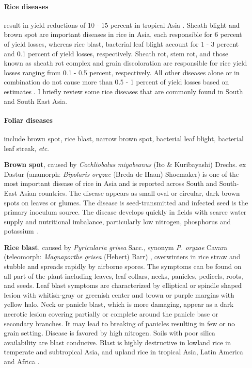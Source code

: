 \documentclass[12pt, oneside]{report}
\begin{document}
\paragraph{Rice diseases} result in yield reductions of 10 - 15 percent in tropical Asia \citep{ willocquet2004research}. Sheath blight and brown spot are important diseases in rice in Asia, each responsible for 6 percent of yield losses, whereas rice blast, bacterial leaf blight account for 1 - 3 percent and 0.1 percent of yield losses, respectively. Sheath rot, stem rot, and those known as sheath rot complex and grain discoloration are responsible for rice yield losses ranging from 0.1 - 0.5 percent, respectively. All other diseases alone or in combination do not cause more than 0.5 - 1 percent of yield losses based on estimates \citep{Savary:2000vr, mew2002handbook}. I briefly review some rice diseases that are commonly found in South and South East Asia. 

\paragraph{Foliar diseases} include brown spot, rice blast, narrow brown spot, bacterial leaf blight, bacterial leaf streak, \textit{etc}.

\textbf{Brown spot}, caused by \textit{Cochliobolus miyabeanus} (Ito \& Kuribayashi) Drechs. ex Dastur (anamorph: \textit{Bipolaris oryzae} (Breda de Haan) Shoemaker) is one of the most important disease of rice in Asia and is reported across South and South-East Asian countries. The disease appears as small oval or circular, dark brown spots on leaves or glumes. The disease is seed-transmitted and infected seed is the primary inoculum source. The disease develops quickly in fields with scarce water supply and nutritional imbalance, particularly low nitrogen, phosphorus and potassium \citep{barnwal2013review}.

\textbf{Rice blast}, caused by \textit{Pyricularia grisea} Sacc., synonym \textit{P. oryzae} Cavara (teleomorph: \textit{Magnaporthe grisea} (Hebert) Barr) \citep{rossman1990pyricularia}, overwinters in rice straw and stubble and spreads rapidly by airborne spores. The symptoms can be found on all part of the plant including leaves, leaf collars, necks, panicles, pedicels, roots, and seeds. Leaf blast symptoms are characterized by elliptical or spindle shaped lesion with whitish-gray or greenish center and brown or purple margins with yellow halo. Neck or panicle blast, which is more damaging, appear as a dark necrotic lesion covering partially or complete around the panicle base or secondary branches. It may lead to breaking of panicles resulting in few or no grain setting. Disease is favored by high nitrogen. Soils with poor silica availability are blast conducive. Blast is highly destructive in lowland rice in temperate and subtropical Asia, and upland rice in tropical Asia, Latin America and Africa \citep{ouricedisease}.
\end{document}
